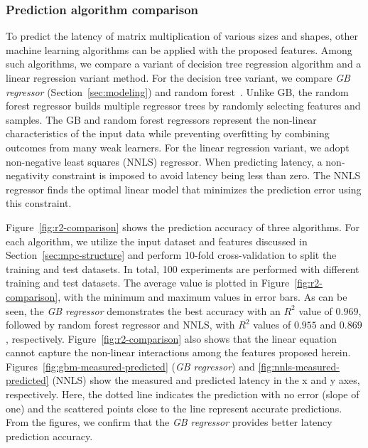 \documentclass[10pt, conference, compsocconf]{IEEEtran}
\begin{document}
\subsubsection{Prediction algorithm comparison}
To predict the latency of matrix multiplication of various sizes and shapes, other machine learning algorithms can be applied with the proposed features. Among such algorithms, we compare a variant of decision tree regression algorithm and a linear regression variant method. For the decision tree variant, we compare \textit{GB regressor} (Section~\ref{sec:modeling}) and random forest~\cite{random-forest}. Unlike GB, the random forest regressor builds multiple regressor trees by randomly selecting features and samples. The GB and random forest regressors represent the non-linear characteristics of the input data while preventing overfitting by combining outcomes from many weak learners. For the linear regression variant, we adopt non-negative least squares (NNLS) regressor. When predicting latency, a non-negativity constraint is imposed to avoid latency being less than zero. The NNLS regressor finds the optimal linear model that minimizes the prediction error using this constraint.

Figure~\ref{fig:r2-comparison} shows the prediction accuracy of three algorithms. For each algorithm, we utilize the input dataset and features discussed in Section~\ref{sec:mpc-structure} and perform 10-fold cross-validation to split the training and test datasets. In total, 100 experiments are performed with different training and test datasets. The average value is plotted in Figure~\ref{fig:r2-comparison}, with the minimum and maximum values in error bars. As can be seen, the \textit{GB regressor} demonstrates the best accuracy with an $R^2$ value of $0.969$, followed by random forest regressor and NNLS, with  $R^2$ values of $0.955$ and $0.869$, respectively. Figure~\ref{fig:r2-comparison} also shows that the linear equation cannot capture the non-linear interactions among the features proposed herein. Figures~\ref{fig:gbm-measured-predicted} (\textit{GB regressor}) and \ref{fig:nnls-measured-predicted} (NNLS) show the measured and predicted latency in the x and y axes, respectively. Here, the dotted line indicates the prediction with no error (slope of one) and the scattered points close to the line represent accurate predictions. From the figures, we confirm that the \textit{GB regressor} provides better latency prediction accuracy.
\end{document}
